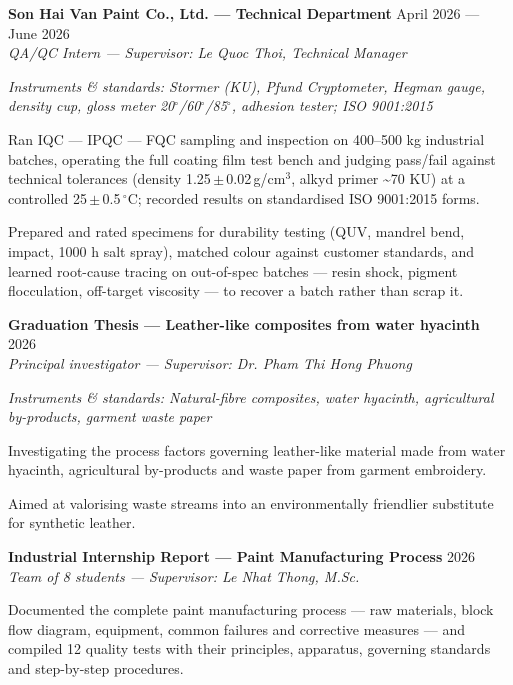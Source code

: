\documentclass[10pt,a4paper]{article}
\newcommand{\dg}{\ensuremath{^\circ}}
\newif\ifcvfirstsection\cvfirstsectiontrue
\renewcommand{\section}[1]{%
  \ifcvfirstsection\cvfirstsectionfalse\else\vspace{0pt plus 2.2fil}\fi
  \par\vspace{5pt}%
  \noindent{\large\bfseries\color{accentcolor}#1}\par
  \nointerlineskip\vspace{-1pt}%
  \noindent{\color{accentcolor}\rule{\linewidth}{0.8pt}}\par
  \nointerlineskip\vspace{2.5pt}%
}
\renewenvironment{itemize}
  {\begin{list}{{\color{accentcolor}\small\raisebox{0.1em}{$\bullet$}}}%
     {\setlength{\leftmargin}{1.1em}%
      \setlength{\itemindent}{0pt}%
      \setlength{\itemsep}{1pt plus 0.6fil}%
      \setlength{\parsep}{0pt}%
      \setlength{\topsep}{1pt plus 0.6fil}%
      \setlength{\listparindent}{0pt}}%
      \RaggedRight}
  {\end{list}}
\newcommand{\jobheader}[3]{
  \vspace{0pt plus 1fil}
  \textbf{#1} \hfill #2 \\
  \textit{#3}
}
\newcommand{\techstack}[1]{
  \par{\small\color{stackgray}\textit{Instruments \& standards: #1}}
}
\begin{document}
\jobheader{Son Hai Van Paint Co., Ltd. --- Technical Department}{April 2026 --- June 2026}{QA/QC Intern --- Supervisor: Le Quoc Thoi, Technical Manager}
\techstack{Stormer (KU), Pfund Cryptometer, Hegman gauge, density cup, gloss meter 20\dg/60\dg/85\dg, adhesion tester; ISO 9001:2015}
\begin{itemize}
  \item Ran IQC --- IPQC --- FQC sampling and inspection on 400--500 kg industrial batches, operating the full coating film test bench and judging pass/fail against technical tolerances (density 1.25\,$\pm$\,0.02\,g/cm$^3$, alkyd primer \textasciitilde70 KU) at a controlled 25\,$\pm$\,0.5\,\dg C; recorded results on standardised ISO 9001:2015 forms.
  \item Prepared and rated specimens for durability testing (QUV, mandrel bend, impact, 1000 h salt spray), matched colour against customer standards, and learned root-cause tracing on out-of-spec batches --- resin shock, pigment flocculation, off-target viscosity --- to recover a batch rather than scrap it.
\end{itemize}

\section{Research \& Projects}

\jobheader{Graduation Thesis --- Leather-like composites from water hyacinth}{2026}{Principal investigator --- Supervisor: Dr. Pham Thi Hong Phuong}
\techstack{Natural-fibre composites, water hyacinth, agricultural by-products, garment waste paper}
\begin{itemize}
  \item Investigating the process factors governing leather-like material made from water hyacinth, agricultural by-products and waste paper from garment embroidery.
  \item Aimed at valorising waste streams into an environmentally friendlier substitute for synthetic leather.
\end{itemize}

\jobheader{Industrial Internship Report --- Paint Manufacturing Process}{2026}{Team of 8 students --- Supervisor: Le Nhat Thong, M.Sc.}
\begin{itemize}
  \item Documented the complete paint manufacturing process --- raw materials, block flow diagram, equipment, common failures and corrective measures --- and compiled 12 quality tests with their principles, apparatus, governing standards and step-by-step procedures.
\end{itemize}
\end{document}

